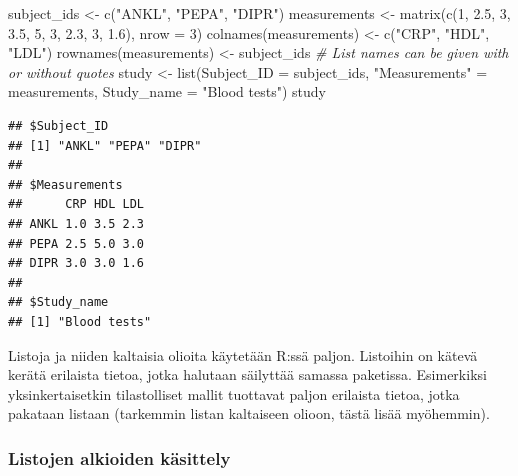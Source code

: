 \documentclass[
]{book}
\newenvironment{Shaded}{\begin{snugshade}}{\end{snugshade}}
\newcommand{\AttributeTok}[1]{\textcolor[rgb]{0.77,0.63,0.00}{#1}}
\newcommand{\CommentTok}[1]{\textcolor[rgb]{0.56,0.35,0.01}{\textit{#1}}}
\newcommand{\DecValTok}[1]{\textcolor[rgb]{0.00,0.00,0.81}{#1}}
\newcommand{\FloatTok}[1]{\textcolor[rgb]{0.00,0.00,0.81}{#1}}
\newcommand{\FunctionTok}[1]{\textcolor[rgb]{0.00,0.00,0.00}{#1}}
\newcommand{\NormalTok}[1]{#1}
\newcommand{\OtherTok}[1]{\textcolor[rgb]{0.56,0.35,0.01}{#1}}
\newcommand{\StringTok}[1]{\textcolor[rgb]{0.31,0.60,0.02}{#1}}
\begin{document}
\begin{Shaded}
\begin{Highlighting}[]
\NormalTok{subject\_ids }\OtherTok{\textless{}{-}} \FunctionTok{c}\NormalTok{(}\StringTok{"ANKL"}\NormalTok{, }\StringTok{"PEPA"}\NormalTok{, }\StringTok{"DIPR"}\NormalTok{)}
\NormalTok{measurements }\OtherTok{\textless{}{-}} \FunctionTok{matrix}\NormalTok{(}\FunctionTok{c}\NormalTok{(}\DecValTok{1}\NormalTok{, }\FloatTok{2.5}\NormalTok{, }\DecValTok{3}\NormalTok{,}
                         \FloatTok{3.5}\NormalTok{, }\DecValTok{5}\NormalTok{, }\DecValTok{3}\NormalTok{,}
                         \FloatTok{2.3}\NormalTok{, }\DecValTok{3}\NormalTok{, }\FloatTok{1.6}\NormalTok{),}
                       \AttributeTok{nrow =} \DecValTok{3}\NormalTok{)}
\FunctionTok{colnames}\NormalTok{(measurements) }\OtherTok{\textless{}{-}} \FunctionTok{c}\NormalTok{(}\StringTok{"CRP"}\NormalTok{, }\StringTok{"HDL"}\NormalTok{, }\StringTok{"LDL"}\NormalTok{)}
\FunctionTok{rownames}\NormalTok{(measurements) }\OtherTok{\textless{}{-}}\NormalTok{ subject\_ids}
\CommentTok{\# List names can be given with or without quotes}
\NormalTok{study }\OtherTok{\textless{}{-}} \FunctionTok{list}\NormalTok{(}\AttributeTok{Subject\_ID =}\NormalTok{ subject\_ids,}
              \StringTok{"Measurements"} \OtherTok{=}\NormalTok{ measurements,}
              \AttributeTok{Study\_name =} \StringTok{"Blood tests"}\NormalTok{)}
\NormalTok{study}
\end{Highlighting}
\end{Shaded}

\begin{verbatim}
## $Subject_ID
## [1] "ANKL" "PEPA" "DIPR"
## 
## $Measurements
##      CRP HDL LDL
## ANKL 1.0 3.5 2.3
## PEPA 2.5 5.0 3.0
## DIPR 3.0 3.0 1.6
## 
## $Study_name
## [1] "Blood tests"
\end{verbatim}

Listoja ja niiden kaltaisia olioita käytetään R:ssä paljon. Listoihin on kätevä kerätä erilaista tietoa, jotka halutaan säilyttää samassa paketissa. Esimerkiksi yksinkertaisetkin tilastolliset mallit tuottavat paljon erilaista tietoa, jotka pakataan listaan (tarkemmin listan kaltaiseen olioon, tästä lisää myöhemmin).

\hypertarget{listojen-alkioiden-kuxe4sittely}{%
\subsubsection{Listojen alkioiden käsittely}\label{listojen-alkioiden-kuxe4sittely}}
\end{document}
